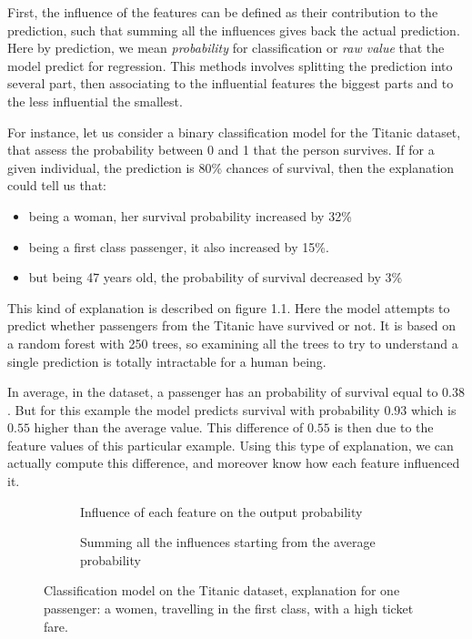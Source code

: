 \documentclass[a4paper,11pt]{kth-mag}
\begin{document}
First, the influence of the features can be defined as their contribution to the prediction, such that summing all the influences gives back the actual prediction. Here by prediction, we mean \textit{probability} for classification or \textit{raw value} that the model predict for regression. This methods involves splitting the prediction into several part, then associating to the influential features the biggest parts and to the less influential the smallest.

For instance, let us consider a binary classification model for the Titanic dataset, that assess the probability between 0 and 1 that the person survives.
If for a given individual, the prediction is 80\% chances of survival, then the explanation could tell us that:

\begin{itemize}
\item being a woman, her survival probability increased by 32\%
\item being a first class passenger, it also increased by 15\%.
\item but being 47 years old, the probability of survival decreased by 3\%
\end{itemize}

This kind of explanation is described on figure 1.1. Here the model attempts to predict whether passengers from the Titanic have survived or not. It is based on a random forest with 250 trees, so examining all the trees to try to understand a single prediction is totally intractable for a human being.

In average, in the dataset, a passenger has an probability of survival equal to $0.38$. But for this example the model predicts survival with probability $0.93$ which is $0.55$ higher than the average value. This difference of $0.55$ is then due to the feature values of this particular example. Using this type of explanation, we can actually compute this difference, and moreover know how each feature influenced it. 

\begin{figure}[h!]
	\begin{subfigure}{1.\textwidth}
    	\centering
    	\def\svgwidth{\columnwidth}
    	
    	\caption{Influence of each feature on the output probability}
    \end{subfigure}
	\begin{subfigure}{1.\textwidth}
    	\centering
    	\def\svgwidth{\columnwidth}
    	
    	\caption{Summing all the influences starting from the average probability}
    \end{subfigure}
    \caption{Classification model on the Titanic dataset, explanation for one passenger: a women, travelling in the first class, with a high ticket fare.}
\end{figure}
\end{document}
